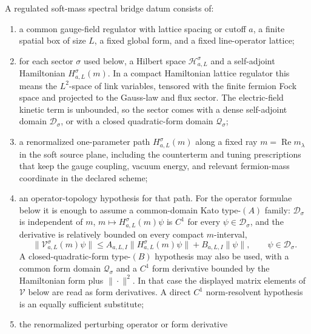 \begin{definition}
\label{def:soft-mass-spectral-bridge-datum}
A regulated soft-mass spectral bridge datum consists of:
\begin{enumerate}[label=(\roman*)]
\item a common gauge-field regulator with lattice spacing or cutoff \(a\), a
  finite spatial box of size \(L\), a fixed global form, and a fixed
  line-operator lattice;
\item for each sector \(\sigma\) used below, a Hilbert space
  \(\mathcal H_{a,L}^{\sigma}\) and a self-adjoint Hamiltonian
  \(H_{a,L}^{\sigma}(m)\).  In a compact Hamiltonian lattice regulator this
  means the \(L^2\)-space of link variables, tensored with the finite fermion
  Fock space and projected to the Gauss-law and flux sector.  The
  electric-field kinetic term is unbounded, so the sector comes with a dense
  self-adjoint domain \(\mathcal D_{\sigma}\), or with a closed quadratic-form
  domain \(\mathcal Q_{\sigma}\);
\item a renormalized one-parameter path \(H_{a,L}^{\sigma}(m)\) along a fixed
  ray \(m=\operatorname{Re}m_\lambda\) in the soft source plane, including the
  counterterm and tuning prescriptions that keep the gauge coupling, vacuum
  energy, and relevant fermion-mass coordinate in the declared scheme;
\item an operator-topology hypothesis for that path.  For the operator
  formulae below it is enough to assume a common-domain Kato type-\((A)\)
  family: \(\mathcal D_{\sigma}\) is independent of \(m\),
  \(m\mapsto H_{a,L}^{\sigma}(m)\psi\) is \(C^1\) for every
  \(\psi\in\mathcal D_{\sigma}\), and the derivative is relatively bounded
  on every compact \(m\)-interval,
  \begin{equation}
    \|\mathcal V_{a,L}^{\sigma}(m)\psi\|
    \le
    A_{a,L,I}\|H_{a,L}^{\sigma}(m)\psi\|
    +B_{a,L,I}\|\psi\|,
    \qquad \psi\in\mathcal D_{\sigma}.
    \label{eq:soft-mass-relative-bound}
  \end{equation}
  A closed-quadratic-form type-\((B)\) hypothesis may also be used, with a
  common form domain \(\mathcal Q_{\sigma}\) and a \(C^1\) form derivative
  bounded by the Hamiltonian form plus \(\|\cdot\|^2\).  In that case the
  displayed matrix elements of \(\mathcal V\) below are read as form
  derivatives.  A direct \(C^1\) norm-resolvent hypothesis is an equally
  sufficient substitute;
\item the renormalized perturbing operator or form derivative

\end{enumerate}
\end{definition}
